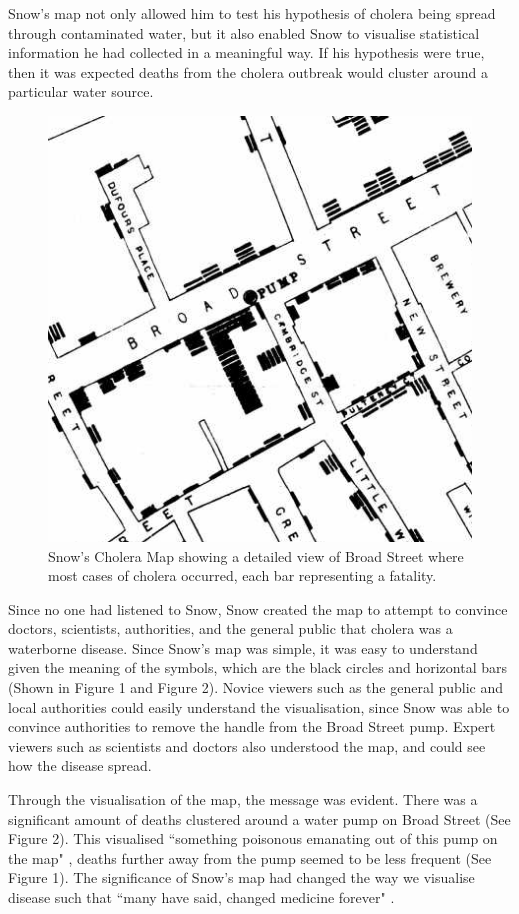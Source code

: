 \documentclass[12pt]{article}
\begin{document}
Snow's map not only allowed him to test his hypothesis of cholera being spread through contaminated water, but it also enabled Snow to visualise statistical information he had collected in a meaningful way. If his hypothesis were true, then it was expected deaths from the cholera outbreak would cluster around a particular water source. 

\begin{figure}
\centering
\includegraphics[scale=0.8]{snow_map_detail}
\caption{Snow's Cholera Map showing a detailed view of Broad Street where most cases of cholera occurred, each bar representing a fatality. }
\label{fig:snow}
\end{figure}

Since no one had listened to Snow, Snow created the map to attempt to convince doctors, scientists, authorities, and the general public that cholera was a waterborne disease. Since Snow's map was simple, it was easy to understand given the meaning of the symbols, which are the black circles and horizontal bars (Shown in Figure 1 and Figure 2). Novice viewers such as the general public and local authorities could easily understand the visualisation, since Snow was able to convince authorities to remove the handle from the Broad Street pump. Expert viewers such as scientists and doctors also understood the map, and could see how the disease spread. 

Through the visualisation of the map, the message was evident. There was a significant amount of deaths clustered around a water pump on Broad Street (See Figure 2). This visualised ``something poisonous emanating out of this pump on the map" \cite{blog}, deaths further away from the pump seemed to be less frequent (See Figure 1). The significance of Snow's map had changed the way we visualise disease such that ``many have said, changed medicine forever" \cite{heros}.
\end{document}
